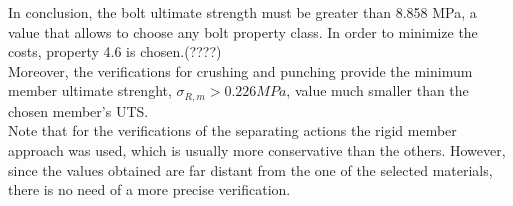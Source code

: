In conclusion, the bolt ultimate strength must be greater than 8.858 MPa, a value that allows to choose any bolt property class. In order to minimize the costs, property 4.6 is chosen.(????) \\
Moreover, the verifications for crushing and punching provide the minimum member ultimate strenght, $\sigma_{R,m} > 0.226 MPa$, value much smaller than the chosen member's UTS.\\
Note that for the verifications of the separating actions the rigid member approach was used, which is usually more conservative than the others. However, since the values obtained are far distant from the one of the selected materials, there is no need of a more precise verification.\\